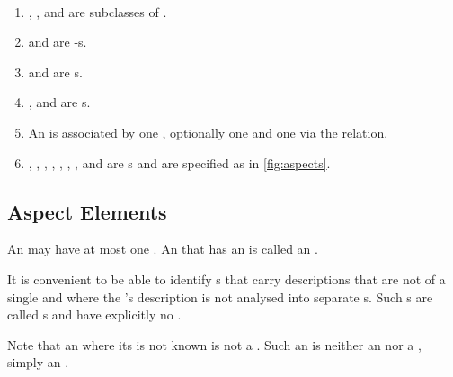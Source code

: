 

\begin{axioms}~
  \begin{enumerate}[resume=axioms,{label=(\arabic*)}]

  \item {}, ,  and  are subclasses of .
    
  \item {} and  are -s.
  \item {} and  are s.
  \item {},  and  are s.

  \item An  is associated by one , optionally one  and one  via the  relation.
  \item
    ,
    ,
    ,
    ,    
    ,   
    ,
    ,
    and
    are s and are specified as in \autoref{fig:aspects}.
  \end{enumerate}
\end{axioms}




\subsection{Aspect Elements}
\label{sec:aspect-elements}

An  may have at most one .
%
An  that has an  is called an
.

It is convenient to be able to identify s that carry
descriptions that are not of a single  and where the
's description is not analysed into separate
s. Such s are called s and
have explicitly no .


Note that an  where its  is not known is not a
. Such an  is neither an
 nor a , simply an .

